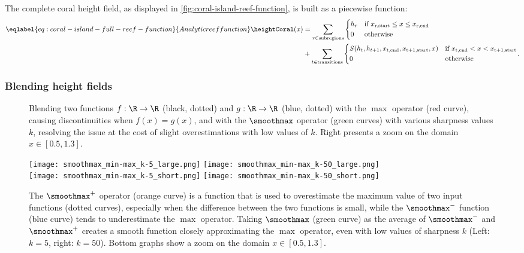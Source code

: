 The complete coral height field, as displayed in \cref{fig:coral-island-reef-function}, is built as a piecewise function:
\begin{align}
    \eqlabel{eq:coral-island-full-reef-function}{Analytic reef function}
    \heightCoral(x) &= \sum_{r \in \text{subregions}}{
    \begin{dcases}
        h_r & \text{if } x_{\text{r,start}} \leq x \leq x_{\text{r,end}} \\
        0 & \text{otherwise}
    \end{dcases}
    } \nonumber \\
    &+
    \sum_{t \in \text{transitions}} {
    \begin{dcases}
        S(h_{t}, h_{t+1}, x_{\text{t,end}}, x_{\text{t+1,start}}, x) & \text{if } x_{\text{t,end}} < x < x_{\text{t+1,start}} \\
        0 & \text{otherwise}
    \end{dcases}
    }.
\end{align}

\subsubsection{Blending height fields}
\label{subsubsec:height-functions-blending}

\begin{figure}[H]
    \caption[Effect of $k$ on the $\smoothmax$ operator]{Blending two functions $f: \R \to \R$ (black, dotted) and $g: \R \to \R$ (blue, dotted) with the $\max$ operator (red curve), causing discontinuities when $f(x)=g(x)$, and with the $\smoothmax$ operator (green curves) with various sharpness values $k$, resolving the issue at the cost of slight overestimations with low values of $k$. Right presents a zoom on the domain $x \in [0.5, 1.3]$. }
    \label{fig:coral-island-blend-function-island}
\end{figure}

\begin{figure}[H]
    \texttt{[image: smoothmax\_min-max\_k-5\_large.png]}
    \texttt{[image: smoothmax\_min-max\_k-50\_large.png]} \\
    \texttt{[image: smoothmax\_min-max\_k-5\_short.png]}
    \texttt{[image: smoothmax\_min-max\_k-50\_short.png]}
    \caption[Definition of $\smoothmax$ as the average of $\smoothmax^+$ and $\smoothmax^-$]{The $\smoothmax^+$ operator (orange curve) is a function that is used to overestimate the maximum value of two input functions (dotted curves), especially when the difference between the two functions is small, while the $\smoothmax^-$ function (blue curve) tends to underestimate the $\max$ operator. Taking $\smoothmax$ (green curve) as the average of $\smoothmax^-$ and $\smoothmax^+$ creates a smooth function closely approximating the $\max$ operator, even with low values of sharpness $k$ (Left: $k=5$, right: $k=50$). Bottom graphs show a zoom on the domain $x \in [0.5, 1.3]$.}
    \label{fig:coral-island-blend-function-island-with-upper}
\end{figure}

